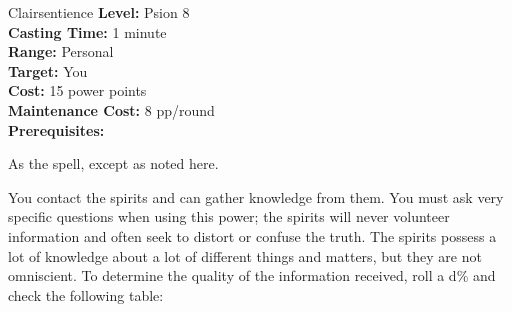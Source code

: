 {Clairsentience}
{
	\textbf{Level:}
	Psion 8\\
	\textbf{Casting Time:}
	1 minute\\
	\textbf{Range:}
	Personal\\
	\textbf{Target:}
	You\\
	\textbf{Cost:}
	15 power points\\
	\textbf{Maintenance Cost:}
	8 pp/round\\
	\textbf{Prerequisites:}
	\\
}
{
	As the  spell, except as noted here.

	You contact the spirits and can gather knowledge from them.	You must ask very specific questions when using this power; the spirits will never volunteer information and often seek to distort or confuse the truth. The spirits possess a lot of knowledge about a lot of different things and matters, but they are not omniscient. To determine the quality of the information received, roll a d\% and check the following table:

}
